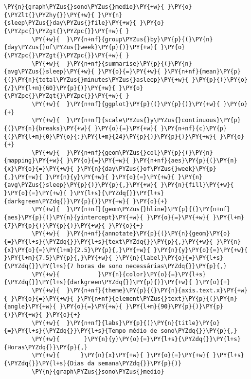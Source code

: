\begin{tcolorbox}[breakable, size=fbox, boxrule=1pt, pad at break*=1mm,colback=cellbackground, colframe=cellborder]
    \begin{Verbatim}[commandchars=\\\{\}]
        \PY{n}{graph\PYZus{}sono\PYZus{}medio}\PY{+w}{ }\PY{o}{\PYZlt{}\PYZhy{}}\PY{+w}{ }\PY{n}{sleep\PYZus{}day\PYZus{}file}\PY{+w}{ }\PY{o}{\PYZpc{}\PYZgt{}\PYZpc{}}\PY{+w}{ }
        \PY{+w}{  }\PY{n+nf}{group\PYZus{}by}\PY{p}{(}\PY{n}{day\PYZus{}of\PYZus{}week}\PY{p}{)}\PY{+w}{ }\PY{o}{\PYZpc{}\PYZgt{}\PYZpc{}}\PY{+w}{ }
        \PY{+w}{  }\PY{n+nf}{summarise}\PY{p}{(}\PY{n}{avg\PYZus{}sleep}\PY{+w}{ }\PY{o}{=}\PY{+w}{ }\PY{n+nf}{mean}\PY{p}{(}\PY{n}{total\PYZus{}minutes\PYZus{}asleep}\PY{+w}{ }\PY{p}{)}\PY{o}{/}\PY{l+m}{60}\PY{p}{)}\PY{+w}{ }\PY{o}{\PYZpc{}\PYZgt{}\PYZpc{}}\PY{+w}{ }
        \PY{+w}{  }\PY{n+nf}{ggplot}\PY{p}{(}\PY{p}{)}\PY{+w}{ }\PY{o}{+}
        \PY{+w}{  }\PY{n+nf}{scale\PYZus{}y\PYZus{}continuous}\PY{p}{(}\PY{n}{breaks}\PY{+w}{ }\PY{o}{=}\PY{+w}{ }\PY{n+nf}{c}\PY{p}{(}\PY{l+m}{0}\PY{o}{:}\PY{l+m}{24}\PY{p}{)}\PY{p}{)}\PY{+w}{ }\PY{o}{+}
        \PY{+w}{  }\PY{n+nf}{geom\PYZus{}col}\PY{p}{(}\PY{n}{mapping}\PY{+w}{ }\PY{o}{=}\PY{+w}{ }\PY{n+nf}{aes}\PY{p}{(}\PY{n}{x}\PY{o}{=}\PY{+w}{ }\PY{n}{day\PYZus{}of\PYZus{}week}\PY{p}{,}\PY{+w}{ }\PY{n}{y}\PY{+w}{ }\PY{o}{=}\PY{+w}{ }\PY{n}{avg\PYZus{}sleep}\PY{p}{)}\PY{p}{,}\PY{+w}{ }\PY{n}{fill}\PY{+w}{ }\PY{o}{=}\PY{+w}{ }\PY{l+s}{\PYZdq{}}\PY{l+s}{darkgreen\PYZdq{}}\PY{p}{)}\PY{+w}{ }\PY{o}{+}
        \PY{+w}{  }\PY{n+nf}{geom\PYZus{}hline}\PY{p}{(}\PY{n+nf}{aes}\PY{p}{(}\PY{n}{yintercept}\PY{+w}{ }\PY{o}{=}\PY{+w}{ }\PY{l+m}{7}\PY{p}{)}\PY{p}{)}\PY{+w}{ }\PY{o}{+}
        \PY{+w}{  }\PY{n+nf}{annotate}\PY{p}{(}\PY{n}{geom}\PY{o}{=}\PY{l+s}{\PYZdq{}}\PY{l+s}{text\PYZdq{}}\PY{p}{,}\PY{+w}{ }\PY{n}{x}\PY{o}{=}\PY{l+m}{2.5}\PY{p}{,}\PY{+w}{ }\PY{n}{y}\PY{o}{=}\PY{+w}{ }\PY{l+m}{7.5}\PY{p}{,}\PY{+w}{ }\PY{n}{label}\PY{o}{=}\PY{l+s}{\PYZdq{}}\PY{l+s}{7 horas de sono necessárias\PYZdq{}}\PY{p}{,}
        \PY{+w}{           }\PY{n}{color}\PY{o}{=}\PY{l+s}{\PYZdq{}}\PY{l+s}{darkgreen\PYZdq{}}\PY{p}{)}\PY{+w}{ }\PY{o}{+}
        \PY{+w}{  }\PY{n+nf}{theme}\PY{p}{(}\PY{n}{axis.text.x}\PY{+w}{ }\PY{o}{=}\PY{+w}{ }\PY{n+nf}{element\PYZus{}text}\PY{p}{(}\PY{n}{angle}\PY{+w}{ }\PY{o}{=}\PY{+w}{ }\PY{l+m}{90}\PY{p}{)}\PY{p}{)}\PY{+w}{ }\PY{o}{+}
        \PY{+w}{  }\PY{n+nf}{labs}\PY{p}{(}\PY{n}{title}\PY{o}{=}\PY{l+s}{\PYZdq{}}\PY{l+s}{Tempo médio de sono\PYZdq{}}\PY{p}{,}
        \PY{+w}{       }\PY{n}{y}\PY{o}{=}\PY{l+s}{\PYZdq{}}\PY{l+s}{Horas\PYZdq{}}\PY{p}{,}
        \PY{+w}{      }\PY{n}{x}\PY{+w}{ }\PY{o}{=}\PY{+w}{ }\PY{l+s}{\PYZdq{}}\PY{l+s}{Dias da semana\PYZdq{}}\PY{p}{)}
        \PY{n}{graph\PYZus{}sono\PYZus{}medio}
    \end{Verbatim}
\end{tcolorbox}


